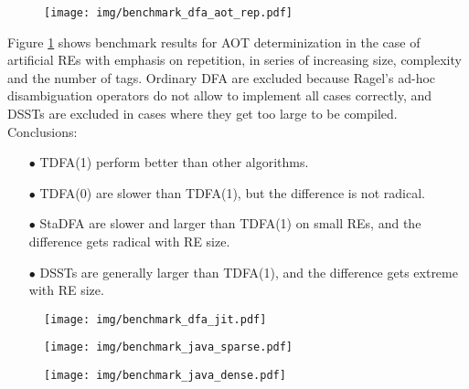 \documentclass[]{article}
\begin{document}
\begin{figure}[t!]
\texttt{[image: img/benchmark\_dfa\_aot\_rep.pdf]}
\label{fig:benchmark_dfa_aot_rep}
\end{figure}

Figure \ref{fig:benchmark_dfa_aot_rep} shows benchmark results for AOT determinization
in the case of artificial REs with emphasis on repetition, in series of increasing size, complexity and the number of tags.
Ordinary DFA are excluded because Ragel's ad-hoc disambiguation operators do not allow to implement all cases correctly,
and DSSTs are excluded in cases where they get too large to be compiled.
Conclusions:
\medskip

\begin{itemize}

\item[$\bullet$]
TDFA(1) perform better than other algorithms.
\medskip

\item[$\bullet$]
TDFA(0) are slower than TDFA(1), but the difference is not radical.
\medskip

\item[$\bullet$]
StaDFA are slower and larger than TDFA(1) on small REs, and the difference gets radical with RE size.
\medskip

\item[$\bullet$]
DSSTs are generally larger than TDFA(1), and the difference gets extreme with RE size.
\medskip

\end{itemize}

\pagebreak

\begin{figure}[t!]
\texttt{[image: img/benchmark\_dfa\_jit.pdf]}
\label{fig:benchmark_dfa_jit}
\end{figure}

\FloatBarrier

\begin{figure}[t!]
\texttt{[image: img/benchmark\_java\_sparse.pdf]}
\label{fig:benchmark_java_sparse}
\end{figure}

\begin{figure}[b!]
\texttt{[image: img/benchmark\_java\_dense.pdf]}
\label{fig:benchmark_java_dense}
\end{figure}
\end{document}
